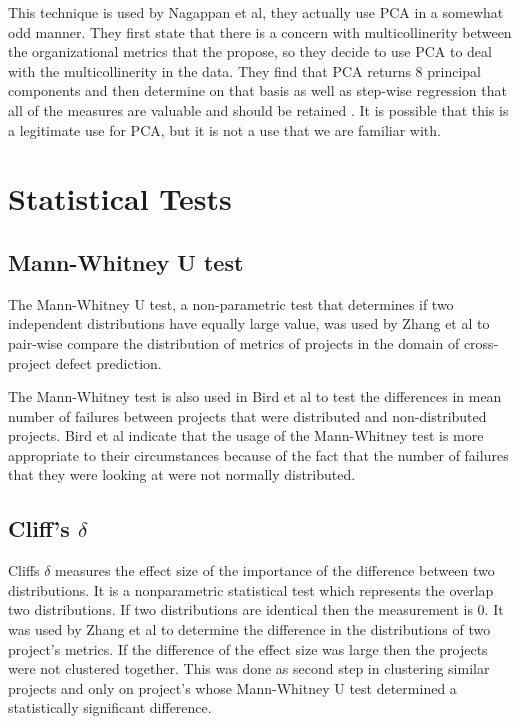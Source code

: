 \documentclass{sig-alternate-05-2015}
\begin{document}
This technique is used by Nagappan et al, they actually use PCA in a somewhat odd manner.  They first state that there is a concern with multicollinerity between the organizational metrics that the propose, so they decide to use PCA to deal with the multicollinerity in the data.  They find that PCA returns 8 principal components and then determine on that basis as well as step-wise regression that all of the measures are valuable and should be retained \cite{Nagappan}.  It is possible that this is a legitimate use for PCA, but it is not a use that we are familiar with.

\section{Statistical Tests}

\subsection{Mann-Whitney U test}
The Mann-Whitney U test, a non-parametric test that determines if two independent distributions have equally large value,  was used by Zhang et al \cite{Zhang2014} to pair-wise compare the distribution of metrics of projects in the domain of cross-project defect prediction.  

The Mann-Whitney test is also used in Bird et al to test the differences in mean number of failures between projects that were distributed and non-distributed projects. \cite{Bird}  Bird et al indicate that the usage of the Mann-Whitney test is more appropriate to their circumstances because of the fact that the number of failures that they were looking at were not normally distributed.


\subsection{Cliff's $\delta$}
Cliffs $\delta$ measures the effect size of the importance of the difference between two distributions. It is a nonparametric statistical test which represents the overlap two distributions. If two distributions are identical then the measurement is 0.  It was used by Zhang et al \cite{Zhang2014} to determine the difference in the distributions of two project's metrics. If the difference of the effect size was large then the projects were not clustered together.  This was done as second step in clustering similar projects and only on project's whose Mann-Whitney U test determined a statistically significant difference. 
\end{document}

